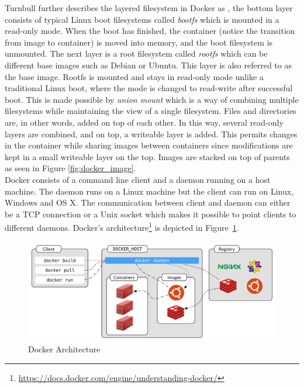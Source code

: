 \noindent
Turnbull further describes the layered filesystem in Docker as 
\cite[p. 2-3]{turnbull2016dockerbook}, the bottom layer consists of typical Linux boot filesystems called \textit{bootfs} which is mounted in a read-only mode. When the boot has finished, the container (notice the transition from image to container) is moved into memory, and the boot filesystem is unmounted. The next layer is a root filesystem called \textit{rootfs} which can be different base images such as Debian or Ubuntu. This layer is also referred to as the base image. Rootfs is mounted and stays in read-only mode unlike a traditional Linux boot, where the mode is changed to read-write after successful boot. This is made possible by \textit{union mount} which is a way of combining multiple filesystems while maintaining the view of a single filesystem. Files and directories are, in other words, added on top of each other. In this way, several read-only layers are combined, and on top, a writeable layer is added. This permits changes in the container while sharing images between containers since modifications are kept in a small writeable layer on the top. Images are stacked on top of parents as seen in Figure \ref{fig:docker_image}. \\


\noindent
Docker consists of a command line client and a daemon running on a host machine. The daemon runs on a Linux machine but the client can run on Linux, Windows and OS X. The communication between client and daemon can either be a TCP connection or a Unix socket which makes it possible to point clients to different daemons. Docker's architecture\footnote{\url{https://docs.docker.com/engine/understanding-docker/}} is depicted in Figure~\ref{fig:docker_architecture}.

\begin{figure}[H]
    \centering
    \includegraphics[scale=0.45]{figures/docker_architecture}
    \caption{Docker Architecture}
    \label{fig:docker_architecture}
\end{figure}


